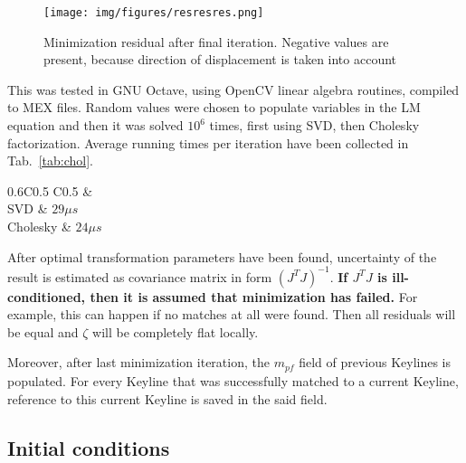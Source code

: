\begin{figure}[ht]
	\centering\texttt{[image: img/figures/resresres.png]}
	\caption{ Minimization residual after final iteration. Negative values are present, because direction of displacement is taken into account }
	\label{fig:minim_res}
\end{figure}

This was tested in GNU Octave, using OpenCV \cite{opencv} linear algebra routines, compiled to MEX files. Random values were chosen to populate variables in the LM equation and then it was solved $10^6$ times, first using SVD, then Cholesky factorization. Average running times per iteration have been collected in Tab.~\ref{tab:chol}.

\begin{table}[ht]
	\centering
	
	\begin{threeparttable}
		\caption{SVD and Cholesky running time comparison}
		\label{tab:chol}
		
		\begin{tabularx}{0.6\textwidth}{C{0.5} C{0.5}}
			\toprule
			 &  \\
			\midrule
			SVD & $29 \mu s$ \\
			Cholesky & $24 \mu s$ \\
			\bottomrule
		\end{tabularx}
		
	\end{threeparttable}
\end{table}


After optimal transformation parameters have been found, uncertainty of the result is estimated as covariance matrix in form $\left( J^T J \right) ^ {-1}$. \textbf{If $J^T J$ is ill-conditioned, then it is assumed that minimization has failed.} For example, this can happen if no matches at all were found. Then all residuals will be equal and $\zeta$ will be completely flat locally.

Moreover, after last minimization iteration, the $m_{pf}$ field of previous Keylines is populated. For every Keyline that was successfully matched to a current Keyline, reference to this current Keyline is saved in the said field.

\subsection{Initial conditions}

